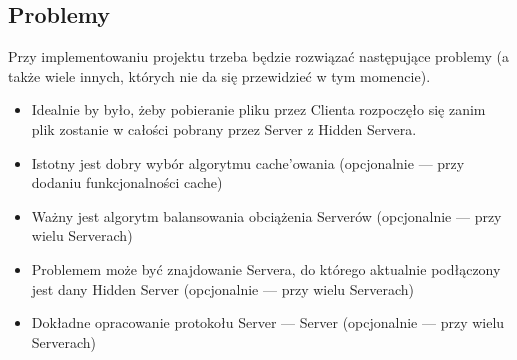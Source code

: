 \documentclass[a4paper,notitlepage]{article}
\begin{document}
\subsection{Problemy}
Przy implementowaniu projektu trzeba będzie rozwiązać następujące problemy (a także 
wiele innych, których nie da się przewidzieć w tym momencie).
\begin{itemize}
\item Idealnie by było, żeby pobieranie pliku przez Clienta rozpoczęło się 
zanim plik zostanie w całości pobrany przez Server z Hidden Servera.
\item Istotny jest dobry wybór algorytmu cache'owania (opcjonalnie --- przy dodaniu funkcjonalności cache)
\item Ważny jest algorytm balansowania obciążenia Serverów (opcjonalnie --- przy wielu Serverach)
\item Problemem może być znajdowanie Servera, do którego aktualnie podłączony jest dany Hidden Server (opcjonalnie --- przy wielu Serverach)
\item Dokładne opracowanie protokołu Server --- Server (opcjonalnie --- przy wielu Serverach)
\end{itemize}
\end{document}
